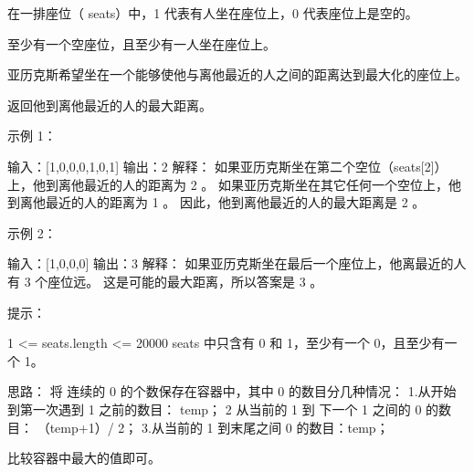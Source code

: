 在一排座位（ seats）中，1 代表有人坐在座位上，0 代表座位上是空的。

至少有一个空座位，且至少有一人坐在座位上。

亚历克斯希望坐在一个能够使他与离他最近的人之间的距离达到最大化的座位上。

返回他到离他最近的人的最大距离。

示例 1：

输入：[1,0,0,0,1,0,1]
输出：2
解释：
如果亚历克斯坐在第二个空位（seats[2]）上，他到离他最近的人的距离为 2 。
如果亚历克斯坐在其它任何一个空位上，他到离他最近的人的距离为 1 。
因此，他到离他最近的人的最大距离是 2 。 

示例 2：

输入：[1,0,0,0]
输出：3
解释： 
如果亚历克斯坐在最后一个座位上，他离最近的人有 3 个座位远。
这是可能的最大距离，所以答案是 3 。

提示：

    1 <= seats.length <= 20000
    seats 中只含有 0 和 1，至少有一个 0，且至少有一个 1。


































思路：
将 连续的 0 的个数保存在容器中，其中 0 的数目分几种情况：
1.从开始到第一次遇到 1 之前的数目： temp；
2 从当前的 1 到 下一个 1 之间的 0 的数目： （temp+1）/ 2；
3.从当前的 1 到末尾之间 0 的数目：temp；

比较容器中最大的值即可。 



































